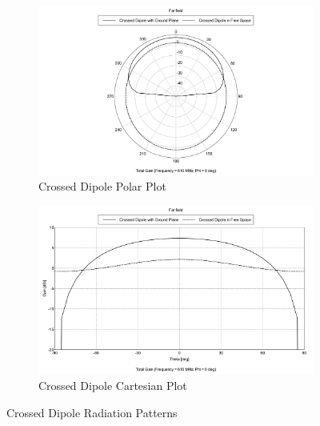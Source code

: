 \documentclass[11pt]{witseiepaper}
\begin{document}
\begin{bibunit}[witseie]
\begin{figure}[htb]
    \centering
    \begin{subfigure}{.5\textwidth}
        \centering
            \includegraphics[width=0.9\linewidth]{Crossed-Dipole-Polar.pdf}
            \caption{Crossed Dipole Polar Plot}
            \label{fig:Crossed-Dipole-Radiation-Patterns-Polar}
        \end{subfigure}%
        \begin{subfigure}{.5\textwidth}
            \centering
            \includegraphics[width=0.9\linewidth]{Crossed-Dipole-Cartesian.pdf}
            \caption{Crossed Dipole Cartesian Plot}
                \label{fig:Crossed-Dipole-Radiation-Patterns-Cartesian}
            \end{subfigure}
\caption{Crossed Dipole Radiation Patterns}
\label{fig:Crossed-Dipole-Radiation-Patterns}
\end{figure}


\end{bibunit}
\end{document}
